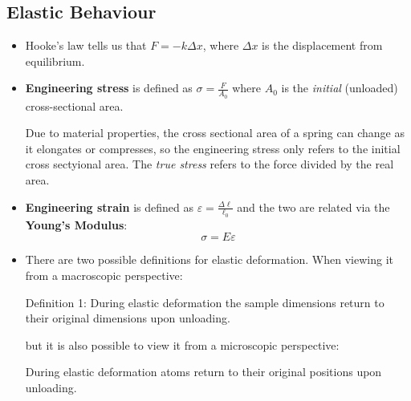 \subsection{Elastic Behaviour}
\begin{itemize}
    \item Hooke's law tells us that $F=-k\Delta x$, where $\Delta x$ is the displacement from equilibrium.
    \item \textbf{Engineering stress} is defined as $\sigma = \frac{F}{A_0}$ where $A_0$ is the \textit{initial} (unloaded) cross-sectional area.
    \begin{warning}
        Due to material properties, the cross sectional area of a spring can change as it elongates or compresses, so the engineering stress only refers to the initial cross sectyional area. The \textit{true stress} refers to the force divided by the real area.
    \end{warning}
    \item \textbf{Engineering strain} is defined as $\varepsilon = \frac{\Delta \ell}{\ell_0}$ and the two are related via the \textbf{Young's Modulus}:
    \begin{equation}
        \sigma = E\varepsilon
    \end{equation}
    \item There are two possible definitions for elastic deformation. When viewing it from a macroscopic perspective:
    \begin{definition}
        Definition 1: During elastic deformation the sample dimensions return to their original dimensions upon unloading.
    \end{definition}
    but it is also possible to view it from a microscopic perspective:
    \begin{definition}
        During elastic deformation atoms return to their original positions upon unloading.
    \end{definition}
\end{itemize}
